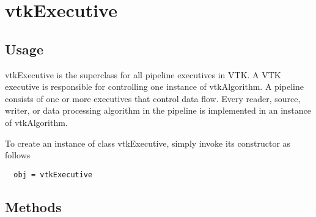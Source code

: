 \section{vtkExecutive}

\subsection{Usage}

 vtkExecutive is the superclass for all pipeline executives in VTK.
 A VTK executive is responsible for controlling one instance of
 vtkAlgorithm.  A pipeline consists of one or more executives that
 control data flow.  Every reader, source, writer, or data
 processing algorithm in the pipeline is implemented in an instance
 of vtkAlgorithm.

To create an instance of class vtkExecutive, simply
invoke its constructor as follows
\begin{verbatim}
  obj = vtkExecutive
\end{verbatim}
\subsection{Methods}


